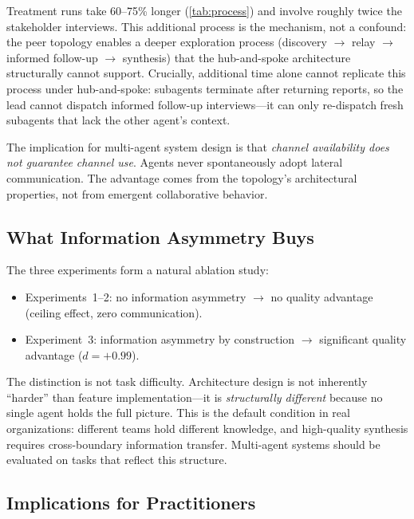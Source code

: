 \documentclass[11pt,letterpaper]{article}
\newcommand{\deff}[1]{\ensuremath{d = #1}}
\begin{document}
Treatment runs take 60--75\% longer (\cref{tab:process}) and involve
roughly twice the stakeholder interviews. This additional process is
the mechanism, not
a confound: the peer topology enables a deeper exploration process
(discovery $\to$ relay $\to$ informed follow-up $\to$ synthesis) that
the hub-and-spoke architecture structurally cannot support.
Crucially, additional time alone cannot replicate this process under
hub-and-spoke: subagents terminate after returning reports, so the
lead cannot dispatch informed follow-up interviews---it can only
re-dispatch fresh subagents that lack the other agent's context.

The implication for multi-agent system design is that \emph{channel
availability does not guarantee channel use}. Agents never spontaneously
adopt lateral communication. The advantage comes from the topology's
architectural properties, not from emergent collaborative behavior.

\subsection{What Information Asymmetry Buys}

The three experiments form a natural ablation study:
\begin{itemize}
  \item Experiments~1--2: no information asymmetry $\to$ no quality
    advantage (ceiling effect, zero communication).
  \item Experiment~3: information asymmetry by construction $\to$
    significant quality advantage (\deff{+0.99}).
\end{itemize}

The distinction is not task difficulty. Architecture design is not
inherently ``harder'' than feature implementation---it is
\emph{structurally different} because no single agent holds the
full picture. This is the default condition in real organizations:
different teams hold different knowledge, and high-quality synthesis
requires cross-boundary information transfer. Multi-agent systems
should be evaluated on tasks that reflect this structure.

\subsection{Implications for Practitioners}
\end{document}
